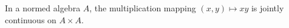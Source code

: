 In a normed algebra $A$, the multiplication mapping $(x, y) \mapsto xy$ is jointly continuous on $A \times A$.
